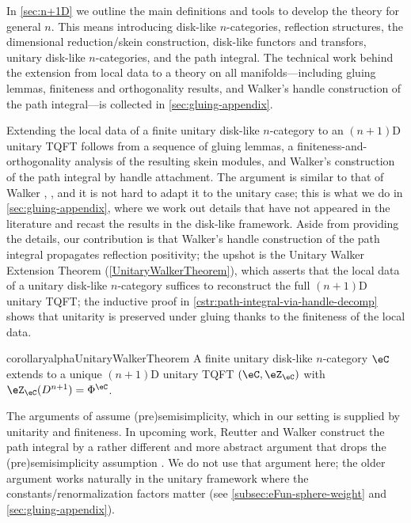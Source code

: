 \documentclass[12pt,reqno]{amsart}
\newcounter{alpha}\renewcommand\thealpha{\upshape\Alph{alpha}}
\newcommand{\psn}{\Phi}
\newcommand{\C}{\eC}
\newcommand{\Z}{\eZ}
\begin{document}
In \cref{sec:n+1D} we outline the main definitions and tools to develop the theory for general $n$. This means introducing disk-like $n$-categories, reflection structures, the dimensional reduction/skein construction, disk-like functors and transfors, unitary disk-like $n$-categories, and the path integral. The technical work behind the extension from local data to a theory on all manifolds---including gluing lemmas, finiteness and orthogonality results, and Walker's handle construction of the path integral---is collected in \cref{sec:gluing-appendix}.

Extending the local data of a finite unitary disk-like $n$-category to an $(n+1)$D unitary TQFT follows from a sequence of gluing lemmas, a finiteness-and-orthogonality analysis of the resulting skein modules, and Walker's construction of the path integral by handle attachment. The argument is similar to that of Walker \cite[\S6]{W06}, \cite[\S4]{W21}, and it is not hard to adapt it to the unitary case; this is what we do in \cref{sec:gluing-appendix}, where we work out details that have not appeared in the literature and recast the results in the disk-like framework. Aside from providing the details, our contribution is that Walker's handle construction of the path integral propagates reflection positivity; the upshot is the Unitary Walker Extension Theorem (\cref{UnitaryWalkerTheorem}), which asserts that the local data of a unitary disk-like $n$-category suffices to reconstruct the full $(n+1)$D unitary TQFT; the inductive proof in \cref{cstr:path-integral-via-handle-decomp} shows that unitarity is preserved under gluing thanks to the finiteness of the local data.

\begin{restatable}{corollaryalpha}{UnitaryWalkerTheorem}
\label{UnitaryWalkerTheorem}
A finite unitary disk-like $n$-category $\C$ extends to a unique $(n+1)$D unitary TQFT $(\C,\Z_\C)$ with $\Z_\C(D^{n+1})=\psn^\C$.
\end{restatable}

The arguments of \cite{W06,W21} assume (pre)semisimplicity, which in our setting is supplied by unitarity and finiteness. In upcoming work, Reutter and Walker construct the path integral by a rather different and more abstract argument that drops the (pre)semisimplicity assumption \cite{RW,R20}. We do not use that argument here; the older argument works naturally in the unitary framework where the constants/renormalization factors matter (see \cref{subsec:eFun-sphere-weight} and \cref{sec:gluing-appendix}).
\end{document}

